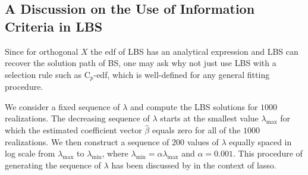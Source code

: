 


\subsection{A Discussion on the Use of Information Criteria in LBS}
Since for orthogonal $X$ the edf of LBS has an analytical expression and LBS can recover the solution path of BS, one may ask why not just use LBS with a selection rule such as C$_p$-edf, which is well-defined for any general fitting procedure. 

We consider a fixed sequence of $\lambda$ and compute the LBS solutions for $1000$ realizations. The decreasing sequence of $\lambda$ starts at the smallest value $\lambda_{\text{max}}$ for which the estimated coefficient vector $\hat{\beta}$ equals zero for all of the $1000$ realizations. We then construct a sequence of $200$ values of $\lambda$ equally spaced in log scale from $\lambda_{\text{max}}$ to $\lambda_{\text{min}}$, where $\lambda_{\text{min}} = \alpha \lambda_{\text{max}}$ and $\alpha=0.001$. This procedure of generating the sequence of $\lambda$ has been discussed by \citet{Friedman2010} in the context of lasso.


